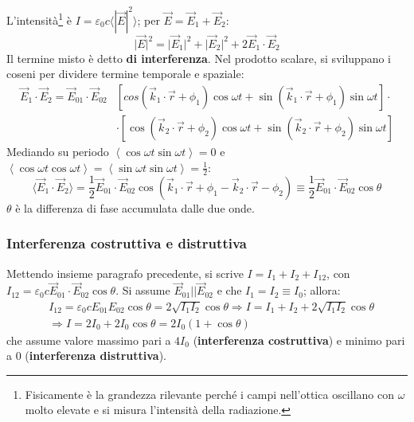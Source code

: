\documentclass[10pt, a4paper]{scrartcl}
\numberwithin{equation}{subsection}
\theoremstyle{style1}
\begin{document}
L'intensit\`a\footnote{Fisicamente \`e la grandezza rilevante perch\'e i campi nell'ottica oscillano con $\omega$ molto elevate e si misura l'intensit\`a della radiazione.} \`e $I = \varepsilon _0 c \langle |\vec{E}| ^2 \rangle$; per $\vec{E}= \vec{E}_1 + \vec{E}_2$:
\begin{equation}
	\lvert \vec{E} \rvert ^2 = \lvert \vec{E}_1 \rvert ^2 + \lvert \vec{E}_2 \rvert ^2+2 \vec{E}_1 \cdot \vec{E}_2
\end{equation}
Il termine misto \`e detto \textbf{di interferenza}. Nel prodotto scalare, si sviluppano i coseni per dividere termine temporale e spaziale:
\[
	\begin{split}
		\vec{E}_1 \cdot \vec{E}_2 = \vec{E}_{01} \cdot \vec{E}_{02} &\left[ cos(\vec{k}_1 \cdot \vec{r}+\phi _1) \cos\omega t + \sin(\vec{k}_1 \cdot \vec{r}+\phi _1) \sin\omega t \right]\cdot \\
									    &\cdot \left[ \cos(\vec{k}_2\cdot \vec{r}+\phi _2) \cos \omega t + \sin(\vec{k}_2 \cdot \vec{r}+\phi _2) \sin \omega t\right] 
	\end{split}
\] 
Mediando su periodo $\left\langle \cos \omega t \sin \omega t \right\rangle=0 $ e $\left\langle \cos \omega t \cos\omega t \right\rangle=\left\langle \sin\omega t \sin\omega t \right\rangle = \frac{1}{2}$:
\begin{equation}
	\langle  \vec{E}_1 \cdot \vec{E}_2\rangle= \frac{1}{2 } \vec{E}_{01} \cdot \vec{E}_{02} \cos(\vec{k}_1 \cdot \vec{r} + \phi _1 - \vec{k}_2 \cdot \vec{r}-\phi _2)\equiv\frac{1}{2 } \vec{E}_{01} \cdot \vec{E}_{02} \cos \theta 
\end{equation}
$\theta $ \`e la differenza di fase accumulata dalle due onde.
\subsubsection{Interferenza costruttiva e distruttiva}
Mettendo insieme paragrafo precedente, si scrive $I = I_1 + I_2 + I_{12} $, con $I_{12} = \varepsilon _0 c \vec{E}_{01} \cdot \vec{E}_{02} \cos\theta $. Si assume $\vec{E}_{01} | | \vec{E}_{02} $ e che $I_1 = I_2 \equiv I_0$; allora:
\begin{equation}
	\begin{split}
		&I_{12}= \varepsilon _0 c E_{01}E_{02}\cos\theta =2 \sqrt{I_1I_2} \cos\theta \Rightarrow I = I_1+I_2+2 \sqrt{I_1I_2} \cos\theta \\
		&\Rightarrow I = 2 I_0 + 2 I_0 \cos \theta = 2I_0(1+ \cos\theta )
	\end{split}
\end{equation}
che assume valore massimo pari a $4I_0$ (\textbf{interferenza costruttiva}) e minimo pari a $0$ (\textbf{interferenza distruttiva}).
\end{document}
